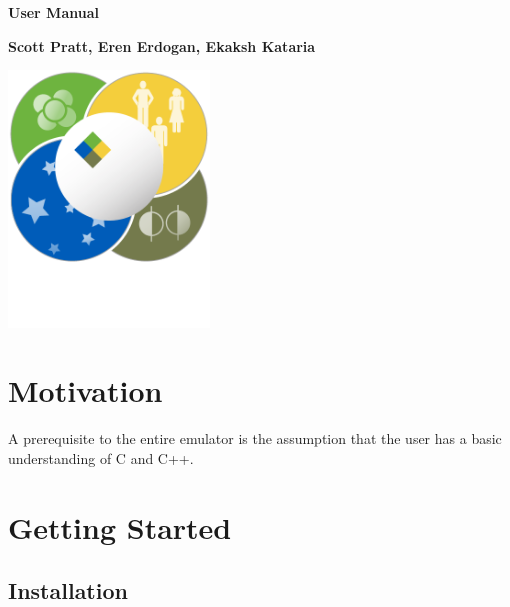 \documentclass[12pt]{article}
\numberwithin{equation}{section}
\numberwithin{figure}{section}
\begin{document}
\begin{titlepage}
   \begin{center}
       \vspace*{1cm}

       \textbf{User Manual}

       \vspace{2.0cm}

       \textbf{Scott Pratt, Eren Erdogan, Ekaksh Kataria}
       
       \vfill
            
       \vspace{0.8cm}
     
       \includegraphics[width=0.4\textwidth]{FRIB_logo.png}
            
            
   \end{center}
\end{titlepage}

\tableofcontents

\newpage


\section{Motivation}



A prerequisite to the entire emulator is the assumption that the user has a basic understanding of C and C++. 


\section{Getting Started}\label{sec:simplex}

\subsection{Installation}
\end{document}
